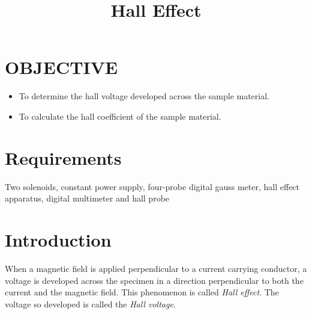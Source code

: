 \documentclass[12pt,a4paper]{article}
\title{Hall Effect}
\begin{document}
		\maketitle
		
		\section{OBJECTIVE}
			\begin{itemize}
				\item 	To determine the hall voltage developed 
				across the sample material.
				
				\item 	To calculate the hall coefficient of the 
				sample material.
			\end{itemize}
		
		\section{Requirements}
		
		Two solenoids, constant power supply, four-probe digital 
		gauss meter, hall effect apparatus, digital multimeter and 
		hall probe
		
		\section{Introduction}
		
		When a magnetic field is applied perpendicular to a current 
		carrying conductor, a voltage is developed across the 
		specimen in a direction perpendicular to both the current and 
		the magnetic field. This phenomenon is called \emph{Hall 
		effect}. The voltage so developed is called the \emph{Hall 
		voltage}.
	
		
		
\end{document}
